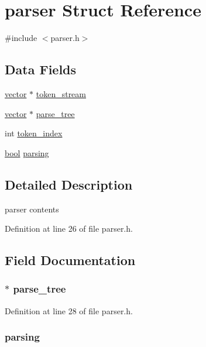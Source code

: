 \hypertarget{structparser}{\section{parser Struct Reference}
\label{structparser}
}


{\ttfamily \#include $<$parser.\+h$>$}

\subsection*{Data Fields}
\begin{DoxyCompactItemize}
\item 
\hyperlink{structvector}{vector} $\ast$ \hyperlink{structparser_a3b32179d2f774c0424b580ead35a17f8}{token\+\_\+stream}
\item 
\hyperlink{structvector}{vector} $\ast$ \hyperlink{structparser_afc34a6b7b98d348b8ee175b9f7fbd416}{parse\+\_\+tree}
\item 
int \hyperlink{structparser_af8d23d2a00960ceeb60670a3558de069}{token\+\_\+index}
\item 
\hyperlink{util_8h_af6a258d8f3ee5206d682d799316314b1}{bool} \hyperlink{structparser_adb874e3c929c95f64c213b00732df0cb}{parsing}
\end{DoxyCompactItemize}


\subsection{Detailed Description}
parser contents 

Definition at line 26 of file parser.\+h.



\subsection{Field Documentation}
\hypertarget{structparser_afc34a6b7b98d348b8ee175b9f7fbd416}{
\subsubsection[{parse\+\_\+tree}]{$\ast$ parse\+\_\+tree}}\label{structparser_afc34a6b7b98d348b8ee175b9f7fbd416}


Definition at line 28 of file parser.\+h.

\hypertarget{structparser_adb874e3c929c95f64c213b00732df0cb}{
\subsubsection[{parsing}]{ parsing}}\label{structparser_adb874e3c929c95f64c213b00732df0cb}


